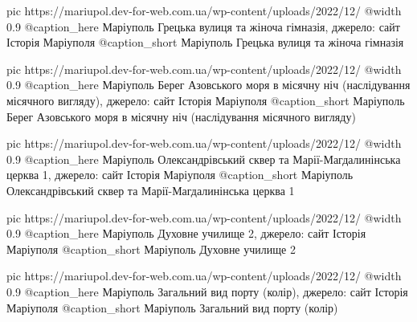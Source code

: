   pic https://mariupol.dev-for-web.com.ua/wp-content/uploads/2022/12/%
  @width 0.9
  @caption_here Маріуполь Грецька вулиця та жіноча гімназія, джерело: сайт Історія Маріуполя
  @caption_short Маріуполь Грецька вулиця та жіноча гімназія

  pic https://mariupol.dev-for-web.com.ua/wp-content/uploads/2022/12/%
  @width 0.9
  @caption_here Маріуполь Берег Азовського моря в місячну ніч (наслідування місячного вигляду), джерело: сайт Історія Маріуполя
  @caption_short Маріуполь Берег Азовського моря в місячну ніч (наслідування місячного вигляду)

  pic https://mariupol.dev-for-web.com.ua/wp-content/uploads/2022/12/%
  @width 0.9
  @caption_here Маріуполь Олександрівський сквер та Марії-Магдалинінська церква 1, джерело: сайт Історія Маріуполя
  @caption_short Маріуполь Олександрівський сквер та Марії-Магдалинінська церква 1

  pic https://mariupol.dev-for-web.com.ua/wp-content/uploads/2022/12/%
  @width 0.9
  @caption_here Маріуполь Духовне училище 2, джерело: сайт Історія Маріуполя
  @caption_short Маріуполь Духовне училище 2

  pic https://mariupol.dev-for-web.com.ua/wp-content/uploads/2022/12/%
  @width 0.9
  @caption_here Маріуполь Загальний вид порту (колір), джерело: сайт Історія Маріуполя
  @caption_short Маріуполь Загальний вид порту (колір)

